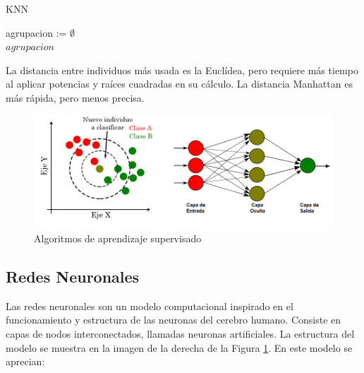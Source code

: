 		\begin{algorithm}
			\caption{KNN}
			agrupacion := $\emptyset$\\
			\Return $agrupacion$
		\end{algorithm}
		
		La distancia entre individuos más usada es la Euclídea, pero requiere más tiempo al aplicar potencias y raíces cuadradas en su cálculo. La distancia Manhattan es más rápida, pero menos precisa.



		
		
		\begin{figure}[!ht]
			\centering
			\includegraphics[width=\textwidth]{images/chapter_2/knn_redneu}
			\caption{Algoritmos de aprendizaje supervisado}
			\label{fig:aprendizaje_supervisado}
		\end{figure}

	\subsection{Redes Neuronales}

		Las redes neuronales son un modelo computacional inspirado en el funcionamiento y estructura de las neuronas del cerebro humano. Consiste en capas de nodos interconectados, llamadas neuronas artificiales. La estructura del modelo se muestra en la imagen de la derecha de la Figura \ref{fig:aprendizaje_supervisado}. En este modelo se aprecian:


